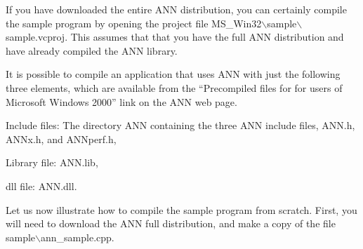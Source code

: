 \documentclass[11pt]{article}		%
\newenvironment{description*}%
  {\begin{description}%
    \setlength{\itemsep}{-0.5ex}%
    \setlength{\parsep}{0pt}}%
  {\end{description}}
\newcommand{\ANN}[0]{\textsf{ANN}}
\newcommand{\BSL}{\hbox{$\backslash$}}
\begin{document}
If you have downloaded the entire {\ANN} distribution, you can certainly
compile the sample program by opening the project file
\textsf{MS\_Win32{\BSL}sample{\BSL}sample.vcproj}.  This assumes that
that you have the full {\ANN} distribution and have already compiled the
{\ANN} library.

It is possible to compile an application that uses {\ANN} with just the
following three elements, which are available from the ``Precompiled
files for for users of Microsoft Windows 2000'' link on the {\ANN} web
page.
%
\begin{description*}
\item[Include files:] The directory \textsf{ANN} containing the three
	{\ANN} include files, \textsf{ANN.h}, \textsf{ANNx.h}, and
	\textsf{ANNperf.h},
\item[Library file:] \textsf{ANN.lib},
\item[dll file:] \textsf{ANN.dll}.
\end{description*}

Let us now illustrate how to compile the sample program from scratch.
First, you will need to download the ANN full distribution, and make a
copy of the file \textsf{sample{\BSL}ann\_sample.cpp}.
\end{document}
